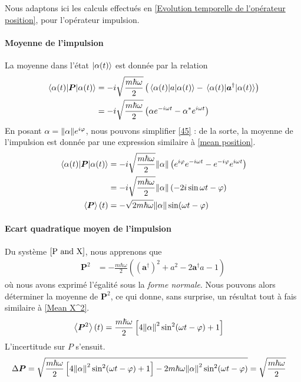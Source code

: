 \documentclass[11pt,oneside,a4paper]{article}
\newcommand{\h}{\ensuremath{\hbar}}
\begin{document}
Nous adaptons ici les calculs effectués en \ref{Evolution temporelle de l'opérateur position}, pour l'opérateur impulsion.

\paragraph{Moyenne de l'impulsion}

La moyenne dans l'état $\ket{\alpha(t)}$ est donnée par la relation
\begin{align}
  \expval{\bm{P}}{\alpha(t)} &= -i\sqrt{\frac{m\h\omega}{2}}\left(\expval{a}{\alpha(t)}-\expval{\bm{a}^\dagger}{\alpha(t)}\right)\notag\\
  &= -i\sqrt{\frac{m\h\omega}{2}}\left(\alpha e^{-i\omega t}-\alpha^*e^{i\omega t}\right)\label{45}
\end{align}
En posant $\alpha = \norm{\alpha}e^{i\varphi}$, nous pouvons simplifier \eqref{45} : de la sorte, la moyenne de l'impulsion est donnée par une expression similaire à \eqref{mean position}.
\begin{align}
  \expval{\bm{P}}{\alpha(t)} &= -i\sqrt{\frac{m\h\omega}{2}}\norm{\alpha}\left(e^{i\varphi}e^{-i\omega t}-e^{-i\varphi}e^{i\omega t}\right)\notag\\
  &= -i\sqrt{\frac{m\h\omega}{2}}\norm{\alpha} \left(-2i\sin\omega t-\varphi\right)\notag\\
  \expval{\bm{P}}(t) &= -\sqrt{2m\h\omega}\norm{\alpha}\sin(\omega t-\varphi) \label{mean P}
\end{align} 

\paragraph{Ecart quadratique moyen de l'impulsion}

Du système $\eqref{P and X}$, nous apprenons que 
\begin{align*}
  \bm{P}^2 &= -\frac{m\h\omega}{2}\left(\left(\bm{a}^\dagger\right)^2+a^2-2\bm{a}^\dagger a-1\right)
\end{align*}
où nous avons exprimé l'égalité sous la \emph{forme normale}. Nous pouvons alors déterminer la moyenne de $\bm{P}^2$, ce qui donne, sans surprise, un résultat tout à fais similaire à \eqref{Mean X^2}.
\begin{align}
  \label{Mean P^2}
  \expval{\bm{P}^2}(t)&= \frac{m\h\omega}{2}\left[4\norm{\alpha}^2\sin^2(\omega t-\varphi)+1\right]
\end{align}
L'incertitude sur $P$ s'ensuit.
\begin{align}
  \Delta \bm{P} &= \sqrt{\frac{m\h\omega}{2}\left[4\norm{\alpha}^2\sin^2(\omega t-\varphi)+1\right] - 2m\h\omega\norm{\alpha}^2\sin^2(\omega t-\varphi)} = \sqrt{\frac{m\h\omega}{2}}\notag
\end{align}
\end{document}
